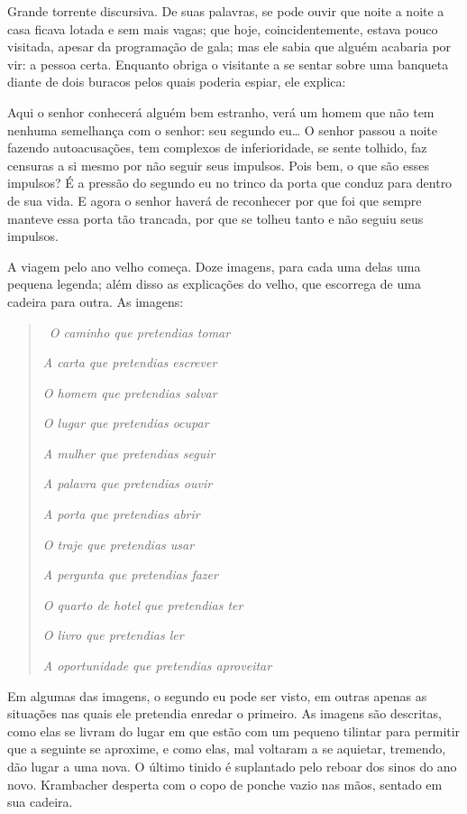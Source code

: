 Grande torrente discursiva. De suas palavras, se pode ouvir que noite a
noite a casa ficava lotada e sem mais vagas; que hoje, coincidentemente,
estava pouco visitada, apesar da programação de gala; mas ele sabia que
alguém acabaria por vir: a pessoa certa. Enquanto obriga o visitante a
se sentar sobre uma banqueta diante de dois buracos pelos quais poderia
espiar, ele explica:

Aqui o senhor conhecerá alguém bem estranho, verá um homem que não tem
nenhuma semelhança com o senhor: seu segundo eu\ldots{} O senhor passou a
noite fazendo autoacusações, tem complexos de inferioridade, se sente
tolhido, faz censuras a si mesmo por não seguir seus impulsos. Pois bem,
o que são esses impulsos? É a pressão do segundo eu no trinco da porta
que conduz para dentro de sua vida. E agora o senhor haverá de
reconhecer por que foi que sempre manteve essa porta tão trancada,
por que se tolheu tanto e não seguiu seus impulsos.

A viagem pelo ano velho começa. Doze imagens, para cada uma delas uma
pequena legenda; além disso as explicações do velho, que escorrega de
uma cadeira para outra. As imagens:

\begin{quote}
\quad\,
\emph{O caminho que pretendias tomar }

\emph{A carta que pretendias escrever }

\emph{O homem que pretendias salvar }

\emph{O lugar que pretendias ocupar }

\emph{A mulher que pretendias seguir }

\emph{A palavra que pretendias ouvir }

\emph{A porta que pretendias abrir }

\emph{O traje que pretendias usar }

\emph{A pergunta que pretendias fazer }

\emph{O quarto de hotel que pretendias ter }

\emph{O livro que pretendias ler }

\emph{A oportunidade que pretendias aproveitar }
\end{quote}

Em algumas das imagens, o segundo eu pode ser visto, em outras apenas as
situações nas quais ele pretendia enredar o primeiro. As imagens são
descritas, como elas se livram do lugar em que estão com um pequeno
tilintar para permitir que a seguinte se aproxime, e como elas, mal
voltaram a se aquietar, tremendo, dão lugar a uma nova. O último tinido
é suplantado pelo reboar dos sinos do ano novo. Krambacher desperta com
o copo de ponche vazio nas mãos, sentado em sua cadeira.

